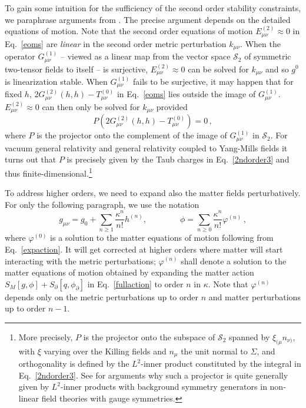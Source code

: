 \documentclass[]{jkpaper}
\theoremstyle{plain}
\theoremstyle{definition}
\begin{document}
To gain some intuition for the sufficiency of the second order stability constraints, we paraphrase  arguments from \cite{Arms:1986vk,Taub2}. The precise argument depends on the detailed equations of motion. Note that the second order equations of motion $E^{(2)}_{\mu \nu}\approx0$ in Eq.~\eqref{eoms} are \emph{linear} in the second order metric perturbation $k_{\mu \nu}$. When the operator $G_{\mu \nu}^{(1)}$ -- viewed as a linear map from the vector space $\mathcal{S}_2$ of symmetric two-tensor fields to itself -- is surjective, $E^{(2)}_{\mu \nu}\approx0$ can be solved for $k_{\mu \nu}$ and so $g^0$ is linearization stable. When $G_{\mu \nu}^{(1)}$ fails to be surjective, it may happen that for fixed $h$, $2G_{\mu \nu}^{(2)}(h,h)-T_{\mu \nu}^{(0)}$ in Eq.~\eqref{eoms} lies outside the image of $G_{\mu \nu}^{(1)}$. $E^{(2)}_{\mu \nu}\approx0$ can then only be solved for $k_{\mu \nu}$ provided
\begin{equation}\label{Taub}
    P\left(2G_{\mu \nu}^{(2)}(h,h)-T_{\mu \nu}^{(0)}\right)=0\,,
\end{equation}
where $P$ is the projector onto the complement of the image of $G_{\mu \nu}^{(1)}$ in $\mathcal{S}_2$. For vacuum general relativity and general relativity coupled to Yang-Mills fields it turns out that $P$ is precisely given by the Taub charges in Eq.~\eqref{2ndorder3} and thus finite-dimensional.\footnote{More precisely, $P$ is the projector onto the subspace of $\mathcal{S}_2$ spanned by $\xi_{(\mu} n_{\nu)}$, with $\xi$ varying over the Killing fields and $n_\mu$ the unit normal to $\Sigma$, and orthogonality is defined by the $L^2$-inner product constituted by the integral in Eq.~\eqref{2ndorder3}. See \cite{arms1981symmetry,Gotay:1997eg} for arguments why such a projector is quite generally given by $L^2$-inner products with background symmetry generators in non-linear field theories with gauge symmetries.} 

To address higher orders, we need to expand also the matter fields perturbatively. For only the following paragraph, we use the notation 
\begin{equation}\label{expansion2}
    g_{\mu \nu}=g_0+\sum_{n\geq1}\frac{\kappa^n}{n!} h^{(n)},\qquad\qquad \phi=\sum_{n\geq0}\frac{\kappa^n}{n!}\varphi^{(n)}\,,
\end{equation}
where $\varphi^{(0)}$ is a solution to the matter equations of motion following from Eq.~\eqref{expaction}. It will get corrected at higher orders where matter will start interacting with the metric perturbations; $\varphi^{(n)}$ shall denote a solution to the matter equations of motion obtained by expanding the matter action $S_M[g,\phi]+S_\partial[q,\phi_\partial]$ in Eq.~\eqref{fullaction} to order $n$ in $\kappa$. Note that $\varphi^{(n)}$ depends only on the metric perturbations up to order $n$ and matter perturbations up to order $n-1$.
\end{document}
